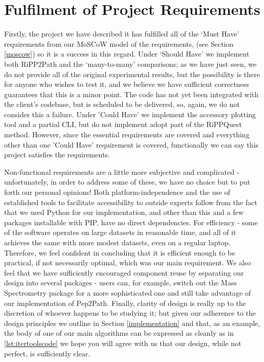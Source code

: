 \documentclass{l4proj}
\begin{document}
\section{Fulfilment of Project Requirements}

Firstly, the project we have described it has fulfilled all of the `Must Have' requirements from our MoSCoW model of the requirements, (see Section \ref{moscow}) so it is a success in this regard. Under `Should Have' we implement both RiPP2Path and the `many-to-many' comparisons; as we have just seen, we do not provide all of the original experimental results, but the possibility is there for anyone who wishes to test it, and we believe we have sufficient correctness guarantees that this is a minor point. The code has not yet been integrated with the client's codebase, but is scheduled to be delivered, so, again, we do not consider this a failure. Under 'Could Have' we implement the accessory plotting tool and a partial CLI, but do not implement adopt part of the RiPPQuest method. However, since the essential requirements are covered and everything other than one 'Could Have' requirement is covered, functionally we can say this project satisfies the requirements.

Non-functional requirements are a little more subjective and complicated - unfortunately, in order to address some of these, we have no choice but to put forth our personal opinions! Both platform-independence and the use of established tools to facilitate accessibility to outside experts follow from the fact that we used Python for our implementation, and other than this and a few packages installable with PIP, have no direct dependencies. For efficiency - some of the software operates on large datasets in reasonable time, and all of it achieves the same with more modest datasets, even on a regular laptop. Therefore, we feel confident in concluding that it is efficient enough to be practical, if not necessarily optimal, which was our main requirement. We also feel that we have sufficiently encouraged component reuse by separating our design into several packages - users can, for example, switch out the Mass Spectrometry package for a more sophisticated one and still take advantage of our implementation of Pep2Path. Finally, clarity of design is really up to the discretion of whoever happens to be studying it; but given our adherence to the design principles we outline in Section \ref{implementation} and that, as an example, the body of one of our main algorithms can be expressed as cleanly as in \ref{lst:itertoolscode} we hope you will agree with us that our design, while not perfect, is sufficiently clear.
\end{document}

